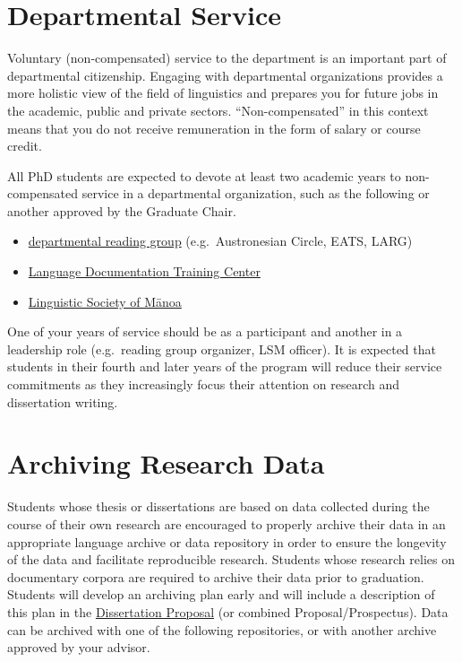 \documentclass[
]{book}
\providecommand{\tightlist}{%
  \setlength{\itemsep}{0pt}\setlength{\parskip}{0pt}}
\begin{document}
\section{Departmental Service}\label{service}

Voluntary (non-compensated) service to the department is an important part of departmental citizenship. Engaging with departmental organizations provides a more holistic view of the field of linguistics and prepares you for future jobs in the academic, public and private sectors. ``Non-compensated'' in this context means that you do not receive remuneration in the form of salary or course credit.

All PhD students are expected to devote at least two academic years to non-compensated service in a departmental organization, such as the following or another approved by the Graduate Chair.

\begin{itemize}
\tightlist
\item
  \href{https://manoa.hawaii.edu/linguistics/research-reading-groups/}{departmental reading group} (e.g.~Austronesian Circle, EATS, LARG)
\item
  \href{http://ldtc.org}{Language Documentation Training Center}
\item
  \href{https://manoa.hawaii.edu/linguistics/linguistic-society-of-manoa/}{Linguistic Society of Mānoa}
\end{itemize}

One of your years of service should be as a participant and another in a leadership role (e.g.~reading group organizer, LSM officer). It is expected that students in their fourth and later years of the program will reduce their service commitments as they increasingly focus their attention on research and dissertation writing.

\section{Archiving Research Data}\label{archiving}

Students whose thesis or dissertations are based on data collected during the course of their own research are encouraged to properly archive their data in an appropriate language archive or data repository in order to ensure the longevity of the data and facilitate reproducible research. Students whose research relies on documentary corpora are required to archive their data prior to graduation. Students will develop an archiving plan early and will include a description of this plan in the \hyperref[dissertation-proposal]{Dissertation Proposal} (or combined Proposal/Prospectus). Data can be archived with one of the following repositories, or with another archive approved by your advisor.
\end{document}
